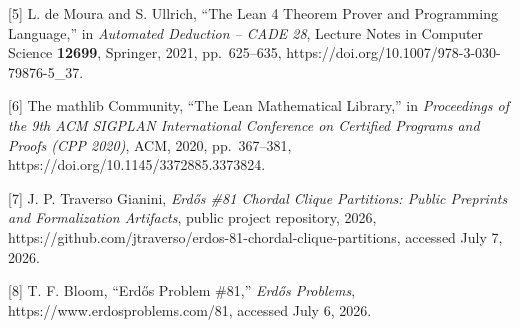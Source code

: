 \documentclass[
  american,
  11pt,
  a4paper,
]{article}
\begin{document}
{[}5{]} L. de Moura and S. Ullrich, ``The Lean 4 Theorem Prover and Programming Language,'' in \emph{Automated Deduction -- CADE 28}, Lecture Notes in Computer Science \textbf{12699}, Springer, 2021, pp.~625--635, https://doi.org/10.1007/978-3-030-79876-5\_37.

{[}6{]} The mathlib Community, ``The Lean Mathematical Library,'' in \emph{Proceedings of the 9th ACM SIGPLAN International Conference on Certified Programs and Proofs (CPP 2020)}, ACM, 2020, pp.~367--381, https://doi.org/10.1145/3372885.3373824.

{[}7{]} J. P. Traverso Gianini, \emph{Erdős \#81 Chordal Clique Partitions: Public Preprints and Formalization Artifacts}, public project repository, 2026, https://github.com/jtraverso/erdos-81-chordal-clique-partitions, accessed July 7, 2026.

{[}8{]} T. F. Bloom, ``Erdős Problem \#81,'' \emph{Erdős Problems}, https://www.erdosproblems.com/81, accessed July 6, 2026.
\end{document}

